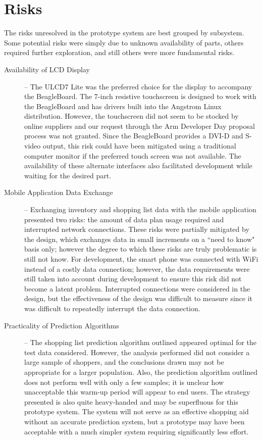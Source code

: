 \documentclass[11pt]{article} %
\begin{document}
\section{Risks}
The risks unresolved in the prototype system are best grouped by subsystem. Some potential risks were simply due to unknown availability of parts, others required further exploration, and still others were more fundamental risks.
\begin{description}
\item[Availability of LCD Display] -- The ULCD7 Lite was the preferred choice for the display to accompany the BeagleBoard. The 7-inch resistive touchscreen is designed to work with the BeagleBoard and has drivers built into the Angstrom Linux distribution. However, the touchscreen did not seem to be stocked by online suppliers and our request through the Arm Developer Day proposal process was not granted. Since the BeagleBoard provides a DVI-D and S-video output, this risk could have been mitigated using a traditional computer monitor if the preferred touch screen was not available. The availability of these alternate interfaces also facilitated development while waiting for the desired part.
\item[Mobile Application Data Exchange] -- Exchanging inventory and shopping list data with the mobile application presented two risks: the amount of data plan usage required and interrupted network connections. These risks were partially mitigated by the design, which exchanges data in small increments on a ``need to know" basis only; however the degree to which these risks are truly problematic is still not know. For development, the smart phone was connected with WiFi instead of a costly data connection; however, the data requirements were still taken into account during development to ensure this risk did not become a latent problem. Interrupted connections were considered in the design, but the effectiveness of the design was difficult to measure since it was difficult to repeatedly interrupt the data connection.
\item[Practicality of Prediction Algorithms] -- The shopping list prediction algorithm outlined appeared optimal for the test data considered. However, the analysis performed did not consider a large sample of shoppers, and the conclusions drawn may not be appropriate for a larger population. Also, the prediction algorithm outlined does not perform well with only a few samples; it is unclear how unacceptable this warm-up period will appear to end users. The strategy presented is also quite heavy-handed and may be superfluous for this prototype system. The system will not serve as an effective shopping aid without an accurate prediction system, but a prototype may have been acceptable with a much simpler system requiring significantly less effort.

\end{description}
\end{document}

